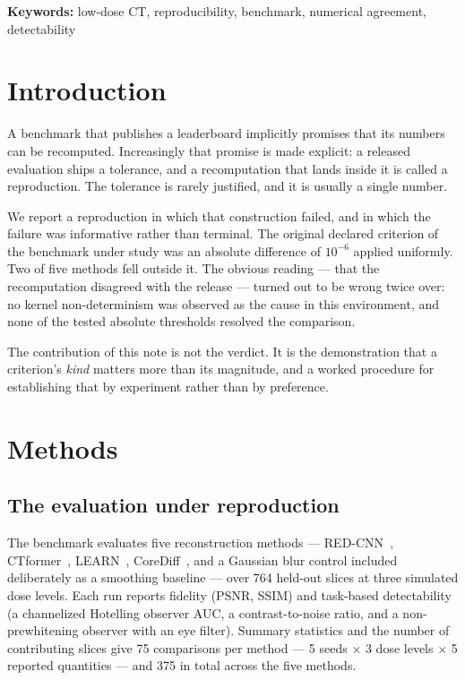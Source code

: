 \documentclass[11pt]{article}
\begin{document}
\noindent\textbf{Keywords:} low-dose CT, reproducibility, benchmark, numerical agreement, detectability

\section{Introduction}

A benchmark that publishes a leaderboard implicitly promises that its numbers can be recomputed.
Increasingly that promise is made explicit: a released evaluation ships a tolerance, and a
recomputation that lands inside it is called a reproduction. The tolerance is rarely justified, and
it is usually a single number.

We report a reproduction in which that construction failed, and in which the failure was informative
rather than terminal. The original declared criterion of the benchmark under study was an absolute
difference of $10^{-6}$ applied uniformly. Two of five methods fell outside it. The obvious
reading --- that the recomputation disagreed with the release --- turned out to be wrong twice over:
no kernel non-determinism was observed as the cause in this environment, and none of the tested
absolute thresholds resolved the comparison.

The contribution of this note is not the verdict. It is the demonstration that a criterion's
\emph{kind} matters more than its magnitude, and a worked procedure for establishing that by
experiment rather than by preference.

\section{Methods}

\subsection{The evaluation under reproduction}

The benchmark evaluates five reconstruction methods --- RED-CNN~\citep{chen2017redcnn},
CTformer~\citep{ctformer2023}, LEARN~\citep{learn2018}, CoreDiff~\citep{corediff2023}, and a
Gaussian blur control included deliberately as a smoothing baseline --- over 764 held-out slices at
three simulated dose levels. Each run reports fidelity (PSNR, SSIM) and task-based detectability
(a channelized Hotelling observer AUC, a contrast-to-noise ratio, and a non-prewhitening observer
with an eye filter). Summary statistics and the number of contributing slices give 75 comparisons per method ---
5 seeds $\times$ 3 dose levels $\times$ 5 reported quantities --- and 375 in total across the
five methods.
\end{document}
